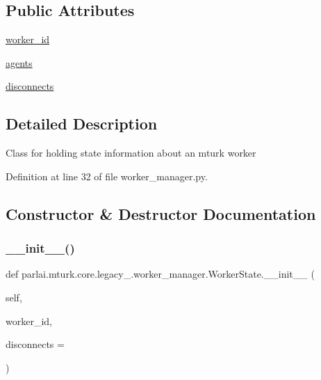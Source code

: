 \subsection*{Public Attributes}
\begin{DoxyCompactItemize}
\item 
\hyperlink{classparlai_1_1mturk_1_1core_1_1legacy__2018_1_1worker__manager_1_1WorkerState_ac69bbf7c4bfd34eb297ae091523f46b5}{worker\+\_\+id}
\item 
\hyperlink{classparlai_1_1mturk_1_1core_1_1legacy__2018_1_1worker__manager_1_1WorkerState_a4165b5a0b9ffcbd8194fd10adeb02fdb}{agents}
\item 
\hyperlink{classparlai_1_1mturk_1_1core_1_1legacy__2018_1_1worker__manager_1_1WorkerState_ac510ecfdd12ff572cb5ad16629dbd36e}{disconnects}
\end{DoxyCompactItemize}


\subsection{Detailed Description}
\begin{DoxyVerb}Class for holding state information about an mturk worker\end{DoxyVerb}
 

Definition at line 32 of file worker\+\_\+manager.\+py.



\subsection{Constructor \& Destructor Documentation}
\mbox{\label{classparlai_1_1mturk_1_1core_1_1legacy__2018_1_1worker__manager_1_1WorkerState_a1f84cd0e83112d5758bdb17b0793f309}} 
\subsubsection{\texorpdfstring{\+\_\+\+\_\+init\+\_\+\+\_\+()}{\_\_init\_\_()}}
{\footnotesize\ttfamily def parlai.\+mturk.\+core.\+legacy\+\_.\+worker\+\_\+manager.\+Worker\+State.\+\_\+\+\_\+init\+\_\+\+\_\+ (\begin{DoxyParamCaption}\item[{}]{self,  }\item[{}]{worker\+\_\+id,  }\item[{}]{disconnects = {} }\end{DoxyParamCaption})}

